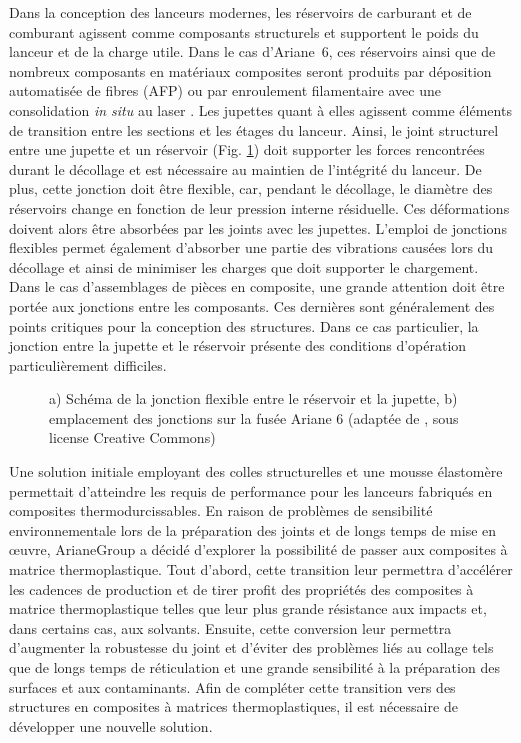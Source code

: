 Dans la conception des lanceurs modernes, les réservoirs de carburant et de comburant agissent comme composants structurels et supportent le poids du lanceur et de la charge utile. 
Dans le cas \mbox{d'Ariane 6}, ces réservoirs ainsi que de nombreux composants en matériaux composites seront produits par déposition automatisée de fibres (AFP) ou par enroulement filamentaire avec une consolidation \textit{in situ} au laser \cite{Krzeminski2014}. 
Les jupettes quant à elles agissent comme éléments de transition entre les sections et les étages du lanceur. 
Ainsi, le joint structurel entre une jupette et un réservoir (Fig. \ref{fig:schema_jonction}) doit supporter les forces rencontrées durant le décollage et est nécessaire au maintien de l'intégrité du lanceur. 
De plus, cette jonction doit être flexible, car, pendant le décollage, le diamètre des réservoirs change en fonction de leur pression interne résiduelle. 
Ces déformations doivent alors être absorbées par les joints avec les jupettes. 
L'emploi de jonctions flexibles permet également d'absorber une partie des vibrations causées lors du décollage et ainsi de minimiser les charges que doit supporter le chargement. 
Dans le cas d'assemblages de pièces en composite, une grande attention doit être portée aux jonctions entre les composants. 
Ces dernières sont généralement des points critiques pour la conception des structures. 
Dans ce cas particulier, la jonction entre la jupette et le réservoir présente des conditions d'opération particulièrement difficiles. 

\begin{figure}[h!]
	\centering
	\subfigure[]
	{\label{fig:schema_jonction_a} 								
		
	} \qquad
	\caption{a) Schéma de la jonction flexible entre le réservoir et la jupette, b) emplacement des jonctions sur la fusée Ariane 6 (adaptée de \cite{Wikipedia:Ariane6}, sous license Creative Commons)}
	\label{fig:schema_jonction}
\end{figure}

Une solution initiale employant des colles structurelles et une mousse élastomère permettait d'atteindre les requis de performance pour les lanceurs fabriqués en composites thermodurcissables. 
En raison de problèmes de sensibilité environnementale lors de la préparation des joints et de longs temps de mise en œuvre, ArianeGroup a décidé d'explorer la possibilité de passer aux composites à matrice thermoplastique. 
Tout d'abord, cette transition leur permettra d'accélérer les cadences de production et de tirer profit des propriétés des composites à matrice thermoplastique telles que leur plus grande résistance aux impacts et, dans certains cas, aux solvants. 
Ensuite, cette conversion leur permettra d'augmenter la robustesse du joint et d'éviter des problèmes liés au collage tels que de longs temps de réticulation et une grande sensibilité à la préparation des surfaces et aux contaminants. 
Afin de compléter cette transition vers des structures en composites à matrices thermoplastiques, il est nécessaire de développer une nouvelle solution. 

